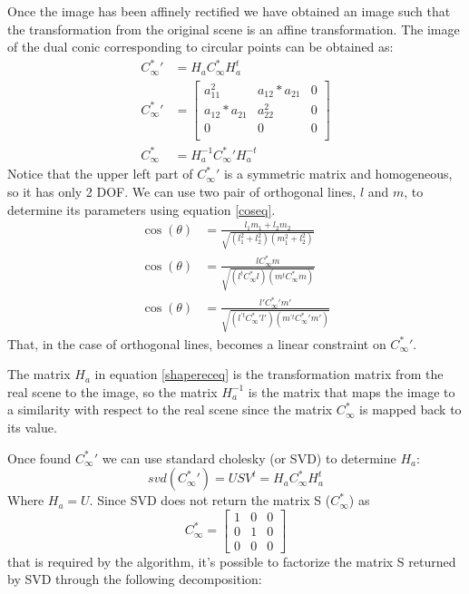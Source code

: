 \documentclass[11pt, oneside]{article}   	%
\begin{document}
Once the image has been affinely rectified we have obtained an image such that the transformation from the original scene is an affine transformation.
The image of the dual conic corresponding to circular points can be obtained as:
\begin{subequations} \label{shapereceq}
\begin{align}
C^*_{\infty}{'} & = H_a C^*_{\infty} H_a^t  \\
C^*_{\infty}{'} & = \begin{bmatrix} 
a_{11}^{2} & a_{12}*a_{21} & 0 \\
 a_{12}*a_{21} &  a_{22}^{2}  & 0 \\
0 &  0 & 0 \\
\end{bmatrix} \\
 C^*_{\infty}  & = H_a ^{-1} C^*_{\infty}{'} H_a ^{-t}
\end{align}
\end{subequations}
Notice that the upper left part of $C^*_{\infty}{'} $ is a symmetric matrix and homogeneous, so it has only 2 DOF.
We can use two pair of orthogonal lines, $l$ and $m$, to determine its parameters using equation \ref{coseq}.
\begin{subequations} \label{coseq}
\begin{align}
\cos(\theta) & = \frac{l_1 m_1 + l_2  m_2}{\sqrt{(l_1^2 + l_2^2)(m_1^2 + l_2 ^2)}}  \\
\cos(\theta) & = \frac{l C^*_{\infty} m} {\sqrt{(l^t C^*_{\infty} l) (m^t C^*_{\infty} m)}} \\
\cos(\theta) & = \frac{l' C^{*}_{\infty}{'} m'} {\sqrt{(l^{'t} C^{*}_{\infty}{'} l') (m^{'t} C^{*}_{\infty}{'} m')}}
\end{align}
\end{subequations}
That, in the case of orthogonal lines, becomes a linear constraint on $C^{*}_{\infty}{'}$.

The matrix $H_a$ in equation \ref{shapereceq} is the transformation matrix from the real scene to the image, so the matrix $H_a^{-1}$ is the matrix that maps the image to a similarity with respect to the real scene since the matrix $C^*_{\infty} $ is mapped back to its value.

Once found $C^*_{\infty}{'}$ we can use standard cholesky (or SVD) to determine $H_a$:
$$
svd(C^*_{\infty}{'}) = USV^{t} = H_a C^*_{\infty} H_a^t 
$$
Where $H_a = U$.
Since SVD does not return the matrix S ($C_{\infty}^*$) as 
$$C_{\infty}^* = \begin{bmatrix} 1 & 0 & 0 \\ 0 & 1 & 0 \\ 0  & 0 & 0\end{bmatrix} $$
that is required by the algorithm, it's possible to factorize the matrix S returned by SVD through the following decomposition:
\end{document}
